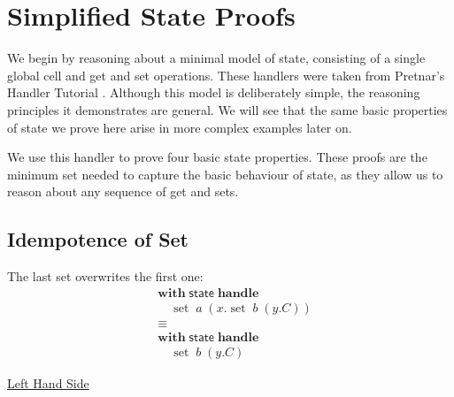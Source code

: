 \documentclass[logo,bsc,singlespacing,parskip]{infthesis}
\begin{document}
\section{Simplified State Proofs}
\label{subsec:simplified-state}
We begin by reasoning about a minimal model of state, consisting of a single global cell and get and set operations. These handlers were taken from Pretnar's Handler Tutorial \cite{pretnar_introduction_2015}. Although this model is deliberately simple, the reasoning principles it demonstrates are general. We will see that the same basic properties of state we prove here arise in more complex examples later on.


We use this handler to prove four basic state properties. These proofs are the minimum set needed to capture the basic behaviour of state, as they allow us to reason about any sequence of get and sets.

\subsection*{Idempotence of Set}
The last set overwrites the first one:
\[
\begin{aligned}
    &\mathsf{\textbf{with}} \; \mathsf{state} \; \mathsf{\textbf{handle}} \\
    &\quad \operatorname{set} \; a \; (x. \operatorname{set} \; b \; (y. C)) \\
    &\equiv \\
    &\mathsf{\textbf{with}} \; \mathsf{state} \; \mathsf{\textbf{handle}} \\
    &\quad \operatorname{set} \; b \; (y. C)
\end{aligned}
\]

\underline{Left Hand Side}
\end{document}

